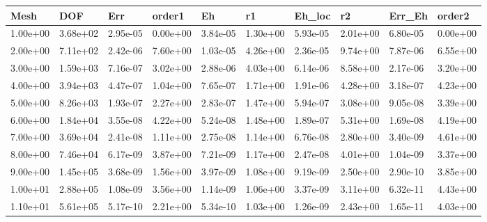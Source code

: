 \begin{tabular}{llllllllll}
Mesh & DOF & Err & order1 & Eh & r1 & Eh_loc & r2 & Err_Eh & order2 \\ 
\hline 
1.00e+00 & 3.68e+02 & 2.95e-05 & 0.00e+00 & 3.84e-05 & 1.30e+00 & 5.93e-05 & 2.01e+00 & 6.80e-05 & 0.00e+00 \\ 
2.00e+00 & 7.11e+02 & 2.42e-06 & 7.60e+00 & 1.03e-05 & 4.26e+00 & 2.36e-05 & 9.74e+00 & 7.87e-06 & 6.55e+00 \\ 
3.00e+00 & 1.59e+03 & 7.16e-07 & 3.02e+00 & 2.88e-06 & 4.03e+00 & 6.14e-06 & 8.58e+00 & 2.17e-06 & 3.20e+00 \\ 
4.00e+00 & 3.94e+03 & 4.47e-07 & 1.04e+00 & 7.65e-07 & 1.71e+00 & 1.91e-06 & 4.28e+00 & 3.18e-07 & 4.23e+00 \\ 
5.00e+00 & 8.26e+03 & 1.93e-07 & 2.27e+00 & 2.83e-07 & 1.47e+00 & 5.94e-07 & 3.08e+00 & 9.05e-08 & 3.39e+00 \\ 
6.00e+00 & 1.84e+04 & 3.55e-08 & 4.22e+00 & 5.24e-08 & 1.48e+00 & 1.89e-07 & 5.31e+00 & 1.69e-08 & 4.19e+00 \\ 
7.00e+00 & 3.69e+04 & 2.41e-08 & 1.11e+00 & 2.75e-08 & 1.14e+00 & 6.76e-08 & 2.80e+00 & 3.40e-09 & 4.61e+00 \\ 
8.00e+00 & 7.46e+04 & 6.17e-09 & 3.87e+00 & 7.21e-09 & 1.17e+00 & 2.47e-08 & 4.01e+00 & 1.04e-09 & 3.37e+00 \\ 
9.00e+00 & 1.45e+05 & 3.68e-09 & 1.56e+00 & 3.97e-09 & 1.08e+00 & 9.19e-09 & 2.50e+00 & 2.90e-10 & 3.85e+00 \\ 
1.00e+01 & 2.88e+05 & 1.08e-09 & 3.56e+00 & 1.14e-09 & 1.06e+00 & 3.37e-09 & 3.11e+00 & 6.32e-11 & 4.43e+00 \\ 
1.10e+01 & 5.61e+05 & 5.17e-10 & 2.21e+00 & 5.34e-10 & 1.03e+00 & 1.26e-09 & 2.43e+00 & 1.65e-11 & 4.03e+00 \\ 
\hline 
\end{tabular}